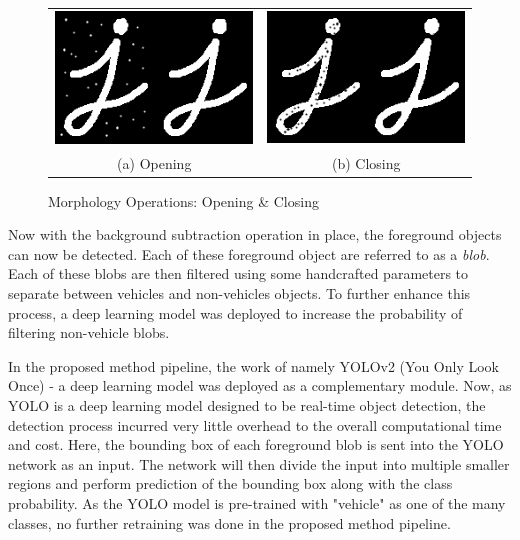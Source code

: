 \begin{figure}[htb!]
  \centering
\begin{tabular}{cc}
 \includegraphics[width=0.4\linewidth]{image/general/opening.png} &  \includegraphics[width=0.4\linewidth]{image/general/closing.png}  \\ 
(a) Opening & (b) Closing \\
\end{tabular}
\caption{Morphology Operations: Opening \& Closing} 
\label{fig:morph2}
\end{figure}




Now with the background subtraction operation in place, the foreground objects can now be detected. Each of these foreground object are referred to as a \textit{blob}. Each of these blobs are then filtered using some handcrafted parameters to separate between vehicles and non-vehicles objects. To further enhance this process, a deep learning model was deployed to increase the probability of filtering non-vehicle blobs. 

In the proposed method pipeline, the work of \cite{redmon2016you} namely YOLOv2 (You Only Look Once) - a deep learning model was deployed as a complementary module. Now, as YOLO is a deep learning model designed to be real-time object detection, the detection process incurred very little overhead to the overall computational time and cost. Here, the bounding box of each foreground blob is sent into the YOLO network as an input. The network will then divide the input into multiple smaller regions and perform prediction of the bounding box along with the class probability. As the YOLO model is pre-trained with "vehicle" as one of the many classes, no further retraining was done in the proposed method pipeline.

